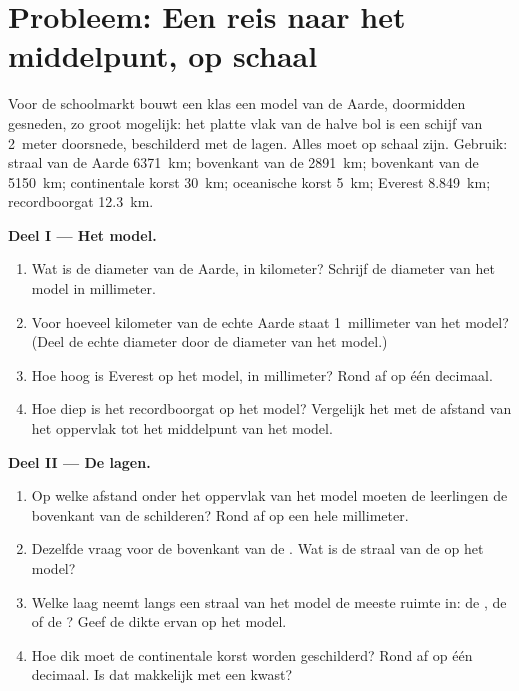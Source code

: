 \section{Probleem: Een reis naar het middelpunt, op schaal}

\begin{problem}
\label{pb:g6:inside-the-earth:1}
Voor de schoolmarkt bouwt een klas een model van de Aarde, doormidden
gesneden, zo groot mogelijk: het platte vlak van de halve bol is een schijf
van 2~meter doorsnede, beschilderd met de lagen. Alles moet op schaal zijn.
Gebruik: straal van de Aarde 6371~km; bovenkant van de 
2891~km; bovenkant van de  5150~km; continentale korst 30~km;
oceanische korst 5~km; Everest 8.849~km; recordboorgat 12.3~km.

\medskip
\noindent\textbf{Deel I --- Het model.}
\begin{enumerate}
  \item Wat is de diameter van de Aarde, in kilometer? Schrijf de diameter
        van het model in millimeter.
  \item Voor hoeveel kilometer van de echte Aarde staat 1~millimeter van
        het model? (Deel de echte diameter door de diameter van het model.)
  \item Hoe hoog is Everest op het model, in millimeter? Rond af op één
        decimaal.
  \item Hoe diep is het recordboorgat op het model? Vergelijk het met de
        afstand van het oppervlak tot het middelpunt van het model.
\end{enumerate}

\medskip
\noindent\textbf{Deel II --- De lagen.}
\begin{enumerate}[resume]
  \item Op welke afstand onder het oppervlak van het model moeten de
        leerlingen de bovenkant van de  schilderen? Rond af op
        een hele millimeter.
  \item Dezelfde vraag voor de bovenkant van de . Wat is de straal
        van de  op het model?
  \item Welke laag neemt langs een straal van het model de meeste ruimte
        in: de , de  of de ? Geef de dikte ervan
        op het model.
  \item Hoe dik moet de continentale korst worden geschilderd? Rond af op
        één decimaal. Is dat makkelijk met een kwast?
\end{enumerate}


\end{problem}
